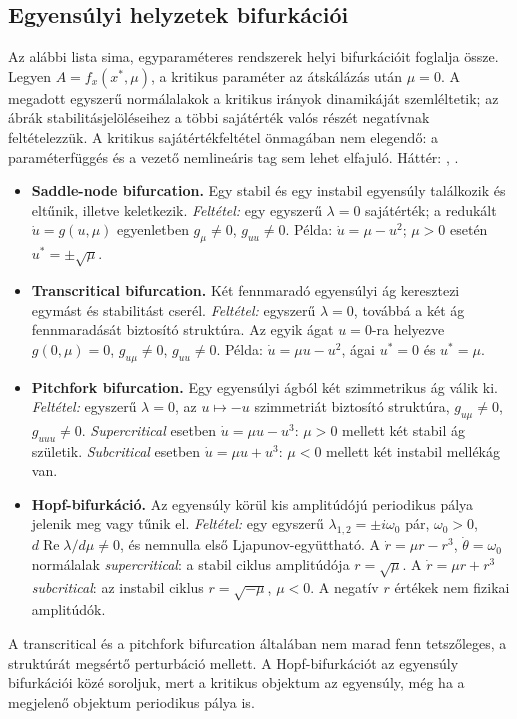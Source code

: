 \subsection{Egyensúlyi helyzetek bifurkációi}\label{sec:eq_bif_types}
Az alábbi lista sima, egyparaméteres rendszerek helyi bifurkációit foglalja össze. Legyen $A=f_x(x^*,\mu)$, a kritikus paraméter az átskálázás után $\mu=0$. A megadott egyszerű normálalakok a kritikus irányok dinamikáját szemléltetik; az ábrák stabilitásjelöléseihez a többi sajátérték valós részét negatívnak feltételezzük. A kritikus sajátértékfeltétel önmagában nem elegendő: a paraméterfüggés és a vezető nemlineáris tag sem lehet elfajuló. Háttér: \cite[2.1.6. szakasz]{dib}, \cite[3. fejezet]{kuznetsov_book}.
\begin{itemize}
\item \textbf{Saddle-node bifurcation.} Egy stabil és egy instabil egyensúly találkozik és eltűnik, illetve keletkezik. \textit{Feltétel:} egy egyszerű $\lambda=0$ sajátérték; a redukált $\dot u=g(u,\mu)$ egyenletben $g_\mu\neq0$, $g_{uu}\neq0$. Példa: $\dot u=\mu-u^2$; $\mu>0$ esetén $u^*=\pm\sqrt\mu$.
\item \textbf{Transcritical bifurcation.} Két fennmaradó egyensúlyi ág keresztezi egymást és stabilitást cserél. \textit{Feltétel:} egyszerű $\lambda=0$, továbbá a két ág fennmaradását biztosító struktúra. Az egyik ágat $u=0$-ra helyezve $g(0,\mu)=0$, $g_{u\mu}\neq0$, $g_{uu}\neq0$. Példa: $\dot u=\mu u-u^2$, ágai $u^*=0$ és $u^*=\mu$.
\item \textbf{Pitchfork bifurcation.} Egy egyensúlyi ágból két szimmetrikus ág válik ki. \textit{Feltétel:} egyszerű $\lambda=0$, az $u\mapsto-u$ szimmetriát biztosító struktúra, $g_{u\mu}\neq0$, $g_{uuu}\neq0$. \textit{Supercritical} esetben $\dot u=\mu u-u^3$: $\mu>0$ mellett két stabil ág születik. \textit{Subcritical} esetben $\dot u=\mu u+u^3$: $\mu<0$ mellett két instabil mellékág van.
\item \textbf{Hopf-bifurkáció.} Az egyensúly körül kis amplitúdójú periodikus pálya jelenik meg vagy tűnik el. \textit{Feltétel:} egy egyszerű $\lambda_{1,2}=\pm i\omega_0$ pár, $\omega_0>0$, $d\operatorname{Re}\lambda/d\mu\neq0$, és nemnulla első Ljapunov-együttható. A $\dot r=\mu r-r^3$, $\dot\theta=\omega_0$ normálalak \textit{supercritical}: a stabil ciklus amplitúdója $r=\sqrt\mu$. A $\dot r=\mu r+r^3$ \textit{subcritical}: az instabil ciklus $r=\sqrt{-\mu}$, $\mu<0$. A negatív $r$ értékek nem fizikai amplitúdók.
\end{itemize}
A transcritical és a pitchfork bifurcation általában nem marad fenn tetszőleges, a struktúrát megsértő perturbáció mellett. A Hopf-bifurkációt az egyensúly bifurkációi közé soroljuk, mert a kritikus objektum az egyensúly, még ha a megjelenő objektum periodikus pálya is.
